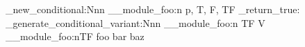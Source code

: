 \prg_new_conditional:Nnn
  \__module_foo:n
  { p, T, F, TF }
  { \prg_return_true: }
\prg_generate_conditional_variant:Nnn  %
  \__module_foo:n
  { TF }
  { V }
\__module_foo:nTF
  { foo }
  { bar }
  { baz }
